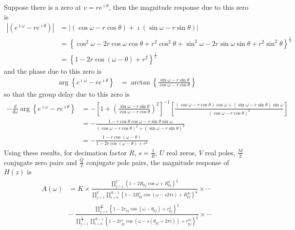 \documentclass[a4paper,twoside,10pt,english]{report}
\begin{document}
\begin{raggedbottom}
Suppose there is a zero at $v=re^{\imath\theta}$, then the magnitude response
due to this zero is 
\begin{align*}
\left|\left(e^{\imath\omega}-re^{\imath\theta}\right)\right| &= \left|\left(\cos\omega-r\cos\theta\right)+\imath\left(\sin\omega-r\sin\theta\right)\right|\\
 &= \left\{ \cos^{2}\omega-2r\cos\omega\cos\theta+r^{2}\cos^{2}\theta+\sin^{2}\omega-2r\sin\omega\sin\theta+r^{2}\sin^{2}\theta\right\} ^{\frac{1}{2}}\\
 &= \left\{ 1-2r\cos\left(\omega-\theta\right)+r^{2}\right\} ^{\frac{1}{2}}
\end{align*}
and the phase due to this zero is
\begin{align*}
\arg\left\{ e^{\imath\omega}-re^{\imath\theta}\right\}  &= \arctan\left\{ \frac{\sin\omega-r\sin\theta}{\cos\omega-r\cos\theta}\right\} 
\end{align*}
so that the group delay due to this zero is 
\begin{align*}
-\frac{d}{d\omega} \arg\left\{ e^{\imath\omega}-re^{\imath\theta}\right\}  &= -\left[1+\left(\frac{\sin\omega-r\sin\theta}{\cos\omega-r\cos\theta}\right)^{2}\right]^{-1}\left[\frac{\left(\cos\omega-r\cos\theta\right)\cos\omega+\left(\sin\omega-r\sin\theta\right)\sin\omega}{\left(\cos\omega-r\cos\theta\right)^{2}}\right]\\
 &= -\frac{1-r\cos\theta\cos\omega-r\sin\theta\sin\omega}{\left(\cos\omega-r\cos\theta\right)^{2}+\left(\sin\omega-r\sin\theta\right)^{2}}\\
 &= -\frac{1-r\cos\left(\omega-\theta\right)}{1-2r\cos\left(\omega-\theta\right)+r^{2}}
\end{align*}
Using these results, for decimation factor $R$, $s=\frac{1}{R}$, $U$ real 
zeros, $V$ real poles, $\frac{M}{2}$ conjugate zero pairs and $\frac{Q}{2}$ 
conjugate pole pairs, the magnitude response of $H\left(z\right)$ is 
\begin{align*}
A\left(\omega\right) &= K \times\frac{\prod_{j=1}^{U}\left\{ 1-2R_{0j}\cos\omega+R_{0j}^{2}\right\} ^{\frac{1}{2}}}{\prod_{j=1}^{V}\prod_{i=0}^{R-1}\left\{ 1-2R_{pj}^{s}\cos\left(\omega-s2\pi i\right)+R_{pj}^{2s}\right\} ^{\frac{1}{2}}}\times\cdots\\
 & \cdots\,\frac{\prod_{j=1}^{\frac{M}{2}}\left\{ 1-2r_{0j}\cos\left(\omega-\theta_{0j}\right)+r_{0j}^{2}\right\} ^{\frac{1}{2}}}{\prod_{j=1}^{\frac{Q}{2}}\prod_{i=0}^{R-1}\left\{ 1-2r_{pj}^{s}\cos\left(\omega-s\left(\theta_{pj}+2\pi i\right)\right)+r_{pj}^{2s}\right\} ^{\frac{1}{2}}}\times\cdots\\

\end{align*}
\end{raggedbottom}
\end{document}
